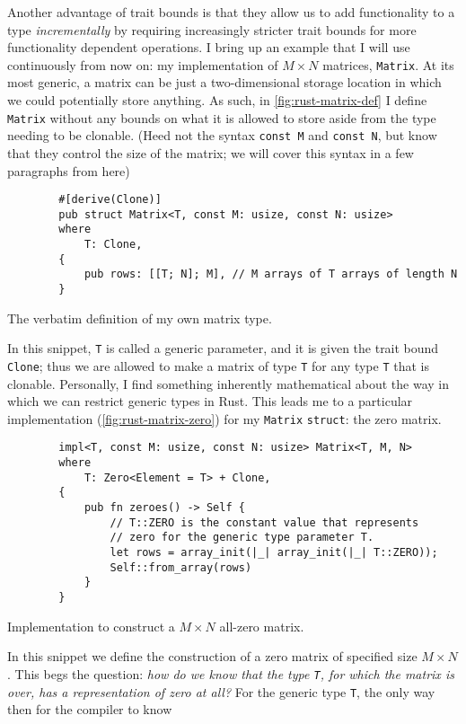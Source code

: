 \documentclass{report}
\newenvironment{code}{\captionsetup{type=listing}}{}
\begin{document}
Another advantage of trait bounds is that they allow us to add functionality to
a type \emph{incrementally} by requiring increasingly stricter trait bounds for
more functionality dependent operations. I bring up an example that I will use
continuously from now on: my implementation of $M\times N$ matrices,
\verb+Matrix+.
At its most generic, a matrix can be just a two-dimensional storage location
in which we could potentially store anything. As such, in
\cref{fig:rust-matrix-def} I define \Verb+Matrix+ without any bounds on what
it is allowed to store aside from the type needing to be clonable.
(Heed not the syntax \Verb+const M+ and \Verb+const N+, but know that they
control the size of the matrix; we will cover this syntax in a few paragraphs
from here)
\begin{code}
    \begin{verbatim}
        #[derive(Clone)]
        pub struct Matrix<T, const M: usize, const N: usize>
        where
            T: Clone,
        {
            pub rows: [[T; N]; M], // M arrays of T arrays of length N
        }
    \end{verbatim}
    \caption{The verbatim definition of my own matrix type.}
    \label{fig:rust-matrix-def}
\end{code}
\noindent
In this snippet, \Verb+T+ is called a generic parameter, and it is given the
trait bound \Verb+Clone+; thus we are allowed to make a matrix of type \Verb+T+
for any type \Verb+T+ that is clonable. Personally, I find something inherently
mathematical about the way in which we can restrict generic types in Rust. This
leads me to a particular implementation (\cref{fig:rust-matrix-zero}) for my
\Verb+Matrix+ \Verb+struct+: the zero matrix.
\begin{code}
    \begin{verbatim}
        impl<T, const M: usize, const N: usize> Matrix<T, M, N>
        where
            T: Zero<Element = T> + Clone,
        {
            pub fn zeroes() -> Self {
                // T::ZERO is the constant value that represents
                // zero for the generic type parameter T.
                let rows = array_init(|_| array_init(|_| T::ZERO));
                Self::from_array(rows)
            }
        }
    \end{verbatim}
    \caption{Implementation to construct a $M\times N$ all-zero matrix.}
    \label{fig:rust-matrix-zero}
\end{code}
\noindent
In this snippet we define the construction of a zero matrix of specified size
$M\times N$. This begs the question: \emph{how do we know
that the type \Verb+T+, for which the matrix is over, has a representation of zero at
all?} For the generic type \Verb+T+, the only way then for the compiler to know
\end{document}
